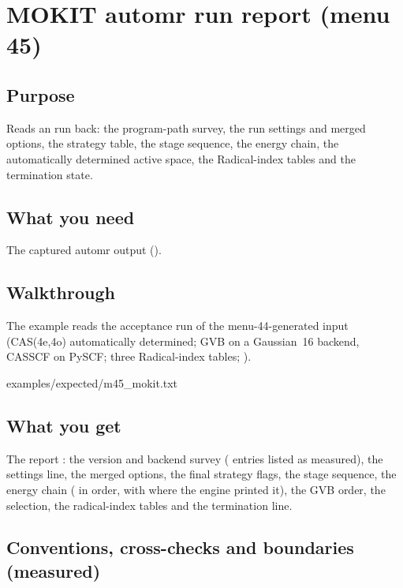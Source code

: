 \chapter{MOKIT automr run report (menu 45)}
\label{ch:menu45}

\section{Purpose}

Reads an  run back: the program-path survey, the run
settings and merged  options, the strategy table, the
stage sequence, the energy chain, the automatically determined active
space, the Radical-index tables and the termination state.

\section{What you need}

The captured automr output ().

\section{Walkthrough}

The example reads the acceptance run of the menu-44-generated input
(CAS(4e,4o) automatically determined; GVB on a Gaussian~16 backend,
CASSCF on PySCF; three Radical-index tables; ).


  {examples/expected/m45_mokit.txt}

\section{What you get}

The report : the version and backend survey
( entries listed as measured), the settings line, the
merged options, the final strategy flags, the stage sequence, the energy
chain ( in order, with
 where the engine printed it), the GVB order, the
 selection, the radical-index tables and the termination
line.

\section{Conventions, cross-checks and boundaries (measured)}


